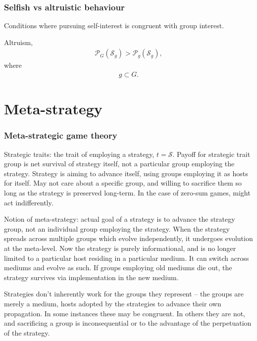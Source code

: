 \documentclass[twocolumn, aps, rmp, amsmath, amssymb, nofootinbib, superscriptaddress, longbibliography, floatfix, table-of-contents, eqsecnum]{revtex4-2}
\begin{document}
\section{Selfish vs altruistic behaviour}

Conditions where pursuing self-interest is congruent with group interest.

Altruism,
\begin{align}
\mathcal{P}_G(\mathcal{S}_g) > \mathcal{P}_g(\mathcal{S}_g),
\end{align}
where
\begin{align}
	g \subset G.
\end{align}

%
%

\part{Meta-strategy}

\section{Meta-strategic game theory}

Strategic traits: the trait of employing a strategy, $t=\mathcal{S}$. Payoff for strategic trait group is net survival of strategy itself, not a particular group employing the strategy. Strategy is aiming to advance itself, using groups employing it as hosts for itself. May not care about a specific group, and willing to sacrifice them so long as the strategy is preserved long-term. In the case of zero-sum games, might act indifferently.

Notion of meta-strategy: actual goal of a strategy is to advance the strategy group, not an individual group employing the strategy. When the strategy spreads across multiple groups which evolve independently, it undergoes evolution at the meta-level. Now the strategy is purely informational, and is no longer limited to a particular host residing in a particular medium. It can switch across mediums and evolve as such. If groups employing old mediums die out, the strategy survives via implementation in the new medium.

Strategies don't inherently work for the groups they represent -- the groups are merely a medium, hosts adopted by the strategies to advance their own propagation. In some instances these may be congruent. In others they are not, and sacrificing a group is inconsequential or to the advantage of the perpetuation of the strategy.
\end{document}
